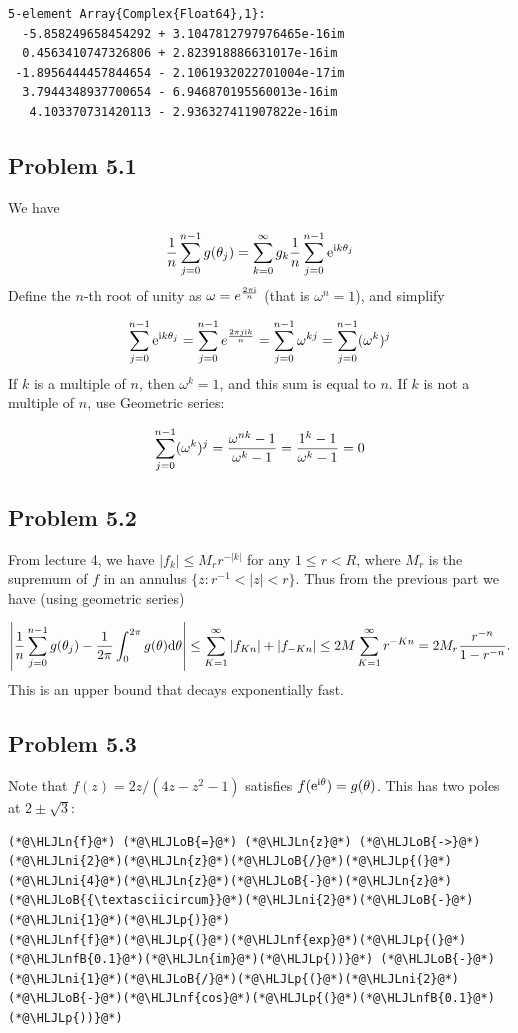 \documentclass[12pt,a4paper]{article}
\newcommand{\HLJLn}[1]{#1}
\newcommand{\HLJLnf}[1]{\textcolor[RGB]{66,102,213}{#1}}
\newcommand{\HLJLnfB}[1]{\textcolor[RGB]{59,151,46}{#1}}
\newcommand{\HLJLni}[1]{\textcolor[RGB]{59,151,46}{#1}}
\newcommand{\HLJLoB}[1]{\textcolor[RGB]{102,102,102}{\textbf{#1}}}
\newcommand{\HLJLp}[1]{#1}
\def\D{ {\rm d} }
\def\I{ {\rm i} }
\def\E{ {\rm e} }
\begin{document}
\begin{lstlisting}
5-element Array{Complex{Float64},1}:
  -5.858249658454292 + 3.1047812797976465e-16im
  0.4563410747326806 + 2.823918886631017e-16im 
 -1.8956444457844654 - 2.1061932022701004e-17im
  3.7944348937700654 - 6.946870195560013e-16im 
   4.103370731420113 - 2.936327411907822e-16im
\end{lstlisting}


\subsection{Problem 5.1}
We have 

\[
{1 \over n} \sum_{j=0}^{n-1} g(\theta_j) = \sum_{k=0}^\infty g_k  {1 \over n} \sum_{j=0}^{n-1} \E^{\I k \theta_j}
\]
Define the $n$-th root of unity as $\omega = e^{2 \pi \I  \over n}$ (that is $\omega^n = 1$), and simplify 

\[
\sum_{j=0}^{n-1} \E^{\I k \theta_j} =\sum_{j=0}^{n-1} e^{{2 \pi j \I k \over n}} =\sum_{j=0}^{n-1} \omega^{kj}= \sum_{j=0}^{n-1} (\omega^k)^j
\]
If $k$ is a multiple of $n$, then $\omega^k = 1$, and this sum is equal to $n$. If $k$ is not a multiple of $n$, use Geometric series:

\[
\sum_{j=0}^{n-1} (\omega^k)^j = {\omega^{nk} - 1 \over \omega^k -1} = {1^k - 1 \over \omega^k-1} = 0
\]
\subsection{Problem 5.2}
From lecture 4, we have $|f_k| \leq M_r r^{-|k|}$ for any $1 \leq r < R$, where $M_r$ is the supremum of $f$ in an annulus $\{ z : r^{-1} < |z| < r \}$. Thus from the previous part we have (using geometric series)

\[
\left| {1 \over n} \sum_{j=0}^{n-1} g(\theta_j)  - { 1\over 2 \pi}	 \int_0^{2\pi} g(\theta) \D \theta \right| \leq \sum_{K=1}^\infty |f_{Kn}| + |f_{-Kn}| \leq 2M \sum_{K=1}^\infty r^{-Kn} = 2M_r {r^{-n} \over 1 - r^{-n}}.
\]
This is an upper bound that  decays exponentially fast. 

\subsection{Problem 5.3}
Note that $f(z) = 2 z/(4z - z^2 - 1)$ satisfies $f(\E^{\I \theta}) = g(\theta)$. This has two poles at $2 \pm \sqrt 3$:


\begin{lstlisting}
(*@\HLJLn{f}@*) (*@\HLJLoB{=}@*) (*@\HLJLn{z}@*) (*@\HLJLoB{->}@*) (*@\HLJLni{2}@*)(*@\HLJLn{z}@*)(*@\HLJLoB{/}@*)(*@\HLJLp{(}@*)(*@\HLJLni{4}@*)(*@\HLJLn{z}@*)(*@\HLJLoB{-}@*)(*@\HLJLn{z}@*)(*@\HLJLoB{{\textasciicircum}}@*)(*@\HLJLni{2}@*)(*@\HLJLoB{-}@*)(*@\HLJLni{1}@*)(*@\HLJLp{)}@*)
(*@\HLJLnf{f}@*)(*@\HLJLp{(}@*)(*@\HLJLnf{exp}@*)(*@\HLJLp{(}@*)(*@\HLJLnfB{0.1}@*)(*@\HLJLn{im}@*)(*@\HLJLp{))}@*) (*@\HLJLoB{-}@*) (*@\HLJLni{1}@*)(*@\HLJLoB{/}@*)(*@\HLJLp{(}@*)(*@\HLJLni{2}@*)(*@\HLJLoB{-}@*)(*@\HLJLnf{cos}@*)(*@\HLJLp{(}@*)(*@\HLJLnfB{0.1}@*)(*@\HLJLp{))}@*)
\end{lstlisting}
\end{document}
